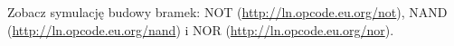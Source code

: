 \documentclass{pdfBooklets}
\begin{document}
Zobacz symulację budowy bramek: NOT (\url{http://ln.opcode.eu.org/not}), NAND (\url{http://ln.opcode.eu.org/nand}) i NOR (\url{http://ln.opcode.eu.org/nor}).
\end{document}
